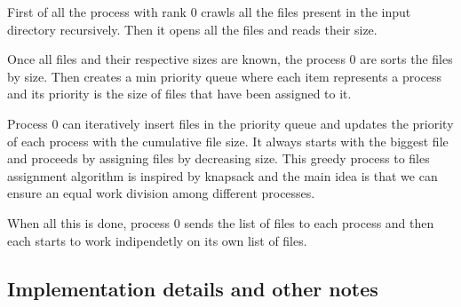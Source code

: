 First of all the process with rank 0 crawls all the files present in the input directory recursively. Then it opens all the files and reads their size.

Once all files and their respective sizes are known, the process 0 are sorts the files by size. Then creates a min priority queue where each item represents a process and its priority is the  size of files that have been assigned to it.

Process 0 can iteratively insert files in the priority queue and updates the priority of each process with the cumulative file size. It always starts with the biggest file and proceeds by assigning files by decreasing size. This greedy process to files assignment algorithm is inspired by knapsack and the main idea is that we can ensure an equal work division among different processes. 

When all this is done, process 0 sends the list of files to each process and then each starts to work indipendetly on its own list of files.



\subsection{Implementation details and other notes}

